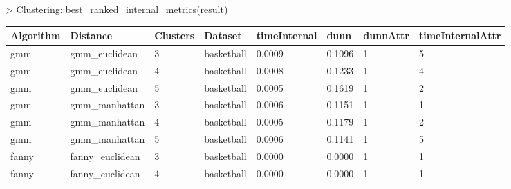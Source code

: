 \begin{itemize}
 \begin{Schunk}
\begin{Sinput}
> Clustering::best_ranked_internal_metrics(result)
\end{Sinput}
\end{Schunk}
\newpage
{\small
\begin{longtable}{| p{1cm} | p{1.8cm} | p{0.9cm} | p{1.1cm} | p{1.6cm} | p{0.8cm} | p{1.3cm} | p{1.8cm} |}
\hline
\scriptsize  Algorithm & \scriptsize     Distance     & \scriptsize Clusters & \scriptsize  Dataset  & \scriptsize timeInternal & \scriptsize  dunn  & \scriptsize dunnAttr & \scriptsize timeInternalAttr \\
\hline
\scriptsize     gmm    & \scriptsize   gmm\_euclidean & \scriptsize    3     & \scriptsize basketball & \scriptsize    0.0009    & \scriptsize 0.1096 & \scriptsize    1     & \scriptsize        5 \\
\scriptsize     gmm    & \scriptsize   gmm\_euclidean & \scriptsize    4     & \scriptsize basketball & \scriptsize    0.0008    & \scriptsize 0.1233 & \scriptsize    1     & \scriptsize        4 \\
\scriptsize     gmm    & \scriptsize   gmm\_euclidean & \scriptsize    5     & \scriptsize basketball & \scriptsize    0.0005    & \scriptsize 0.1619 & \scriptsize    1     & \scriptsize        2 \\
\cline{2-8}
\scriptsize     gmm    & \scriptsize   gmm\_manhattan & \scriptsize    3     & \scriptsize basketball & \scriptsize    0.0006    & \scriptsize 0.1151 & \scriptsize    1     & \scriptsize        1 \\
\scriptsize     gmm    & \scriptsize   gmm\_manhattan & \scriptsize    4     & \scriptsize basketball & \scriptsize    0.0005    & \scriptsize 0.1179 & \scriptsize    1     & \scriptsize        2 \\
\scriptsize     gmm    & \scriptsize   gmm\_manhattan & \scriptsize    5     & \scriptsize basketball & \scriptsize    0.0006    & \scriptsize 0.1141 & \scriptsize    1     & \scriptsize        5 \\
\hline
\scriptsize   fanny    & \scriptsize fanny\_euclidean & \scriptsize    3     & \scriptsize basketball & \scriptsize    0.0000    & \scriptsize 0.0000 & \scriptsize    1     & \scriptsize        1 \\
\scriptsize   fanny    & \scriptsize fanny\_euclidean & \scriptsize    4     & \scriptsize basketball & \scriptsize    0.0000    & \scriptsize 0.0000 & \scriptsize    1     & \scriptsize        1 \\

\end{longtable}}
\end{itemize}
